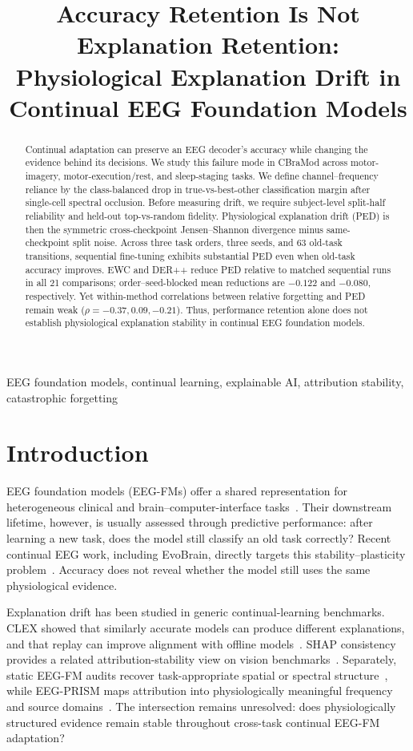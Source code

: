 \documentclass[conference]{IEEEtran}
\title{Accuracy Retention Is Not Explanation Retention:\\
Physiological Explanation Drift in Continual EEG Foundation Models}
\author{\IEEEauthorblockN{Author Name(s)---replace before submission}
\IEEEauthorblockA{Affiliation and contact---replace before submission}}
\begin{document}
\maketitle

\begin{abstract}
Continual adaptation can preserve an EEG decoder's accuracy while changing the
evidence behind its decisions. We study this failure mode in CBraMod across
motor-imagery, motor-execution/rest, and sleep-staging tasks. We define
channel--frequency reliance by the class-balanced drop in true-vs-best-other
classification margin after single-cell spectral occlusion. Before measuring
drift, we require subject-level split-half reliability and held-out
top-vs-random fidelity. Physiological explanation drift (PED) is then the
symmetric cross-checkpoint Jensen--Shannon divergence minus same-checkpoint
split noise. Across three task orders, three seeds, and 63 old-task transitions,
sequential fine-tuning exhibits substantial PED even when old-task accuracy
improves. EWC and DER++ reduce PED relative to matched sequential runs in all
21 comparisons; order--seed-blocked mean reductions are $-0.122$ and $-0.080$,
respectively. Yet within-method correlations between relative forgetting and
PED remain weak ($\rho=-0.37, 0.09, -0.21$). Thus, performance retention alone
does not establish physiological explanation stability in continual EEG
foundation models.
\end{abstract}

\begin{IEEEkeywords}
EEG foundation models, continual learning, explainable AI, attribution
stability, catastrophic forgetting
\end{IEEEkeywords}

\section{Introduction}
EEG foundation models (EEG-FMs) offer a shared representation for heterogeneous
clinical and brain--computer-interface tasks~\cite{wang2025cbramod}. Their
downstream lifetime, however, is usually assessed through predictive
performance: after learning a new task, does the model still classify an old
task correctly? Recent continual EEG work, including EvoBrain, directly targets
this stability--plasticity problem~\cite{zhou2026evobrain}. Accuracy does not
reveal whether the model still uses the same physiological evidence.

Explanation drift has been studied in generic continual-learning benchmarks.
CLEX showed that similarly accurate models can produce different explanations,
and that replay can improve alignment with offline models~\cite{cossu2024clex}.
SHAP consistency provides a related attribution-stability view on vision
benchmarks~\cite{cai2024shapc}. Separately, static EEG-FM audits recover
task-appropriate spatial or spectral structure~\cite{sirca2026beyond,tang2026capture},
while EEG-PRISM maps attribution into physiologically meaningful frequency and
source domains~\cite{shama2026prism}. The intersection remains unresolved:
does physiologically structured evidence remain stable throughout cross-task
continual EEG-FM adaptation?
\end{document}
